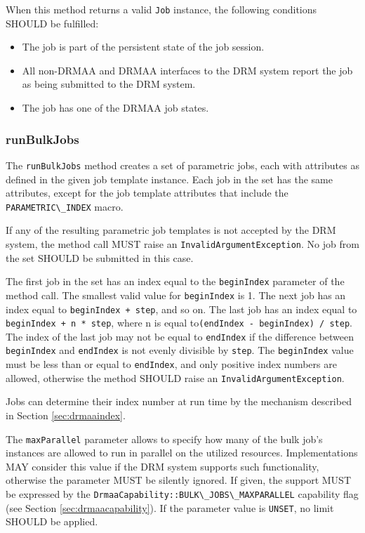 \documentclass{article}
\newcommand{\h}[1]{\lstinline|#1|}
\begin{document}
When this method returns a valid \h{Job} instance, the following conditions SHOULD be fulfilled:

\begin{itemize}
	\item The job is part of the persistent state of the job session.
	\item All non-DRMAA and DRMAA interfaces to the DRM system report the job as being submitted to the DRM system.
	\item The job has one of the DRMAA job states.
\end{itemize}	

\subsubsection{runBulkJobs}
\label{sec:runbulkjobs}

The \h{runBulkJobs} method creates a set of parametric jobs, each with attributes as defined in the given job template instance. Each job in the set has the same attributes, except for the job template attributes that include the \h{PARAMETRIC\_INDEX} macro. 

If any of the resulting parametric job templates is not accepted by the DRM system, the method call MUST raise an \h{InvalidArgumentException}. No job from the set SHOULD be submitted in this case.

The first job in the set has an index equal to the \h{beginIndex} parameter of the method call. The smallest valid value for \h{beginIndex} is 1. The next job has an index equal to \h{beginIndex + step}, and so on. The last job has an index equal to \h{beginIndex + n * step}, where n is equal to\h{(endIndex - beginIndex) / step}. The index of the last job may not be equal to \h{endIndex} if the difference between \h{beginIndex} and \h{endIndex} is not evenly divisible by \h{step}. The \h{beginIndex} value must be less than or equal to \h{endIndex}, and only positive index numbers are allowed, otherwise the method SHOULD raise an \h{InvalidArgumentException}. 

Jobs can determine their index number at run time by the mechanism described in Section \ref{sec:drmaaindex}. 

The \h{maxParallel} parameter allows to specify how many of the bulk job's instances are allowed to run in parallel on the utilized resources. Implementations MAY consider this value if the DRM system supports such functionality, otherwise the parameter MUST be silently ignored.  If given, the support MUST be expressed by the \h{DrmaaCapability::BULK\_JOBS\_MAXPARALLEL} capability flag (see Section \ref{sec:drmaacapability}). If the parameter value is \h{UNSET}, no limit SHOULD be applied.
\end{document}
